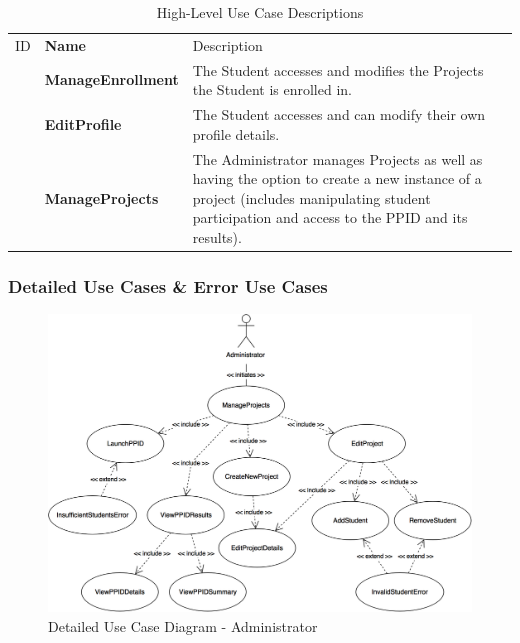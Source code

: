 \documentclass[12pt,letterpaper]{article}
\begin{document}
\begin{table}[H]
	\caption{High-Level Use Case Descriptions}
	\vspace{1em}
	\begin{tabu} to 
	    \tableheader{}ID & Name & Description\\
	    & ManageEnrollment & The Student accesses and modifies the Projects the Student is enrolled in.\\
		& EditProfile & The Student accesses and can modify their own profile details.\\
		& ManageProjects & The Administrator manages Projects as well as having the option to create a new instance of a project (includes manipulating student participation and access to the PPID and its results).\\
	\end{tabu}
\end{table}

\subsubsection*{Detailed Use Cases \& Error Use Cases}

\begin{figure}[H]
	\centering{}
	\includegraphics[scale=0.26]{imgs/detailed-administrator-use-case-diagram.png}
	\caption{Detailed Use Case Diagram - Administrator}
\end{figure}
\end{document}
